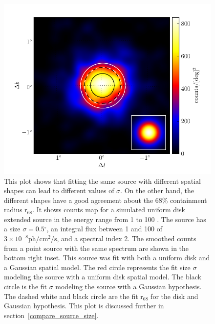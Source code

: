 \documentclass[12pt,preprint]{aastex}
\newcommand{\gev}{\text{GeV}\xspace}
\newcommand{\ph}{\text{ph}\xspace}
\newcommand{\cm}{\text{cm}\xspace}
\renewcommand{\sec}{\text{s}\xspace}
\newcommand{\rsixeight}{{\ensuremath{\text{r}_{68}}}\xspace}
\renewcommand{\deg}{\ensuremath{^\circ}\xspace}
\begin{document}
  \begin{figure}
    \begin{center}
      \includegraphics{mc_plots/compare_r68.pdf}
      \end{center}
      \caption{
      This plot shows that fitting the same source with different spatial
      shapes can lead to different values of $\sigma$. On the other
      hand, the different shapes have a good agreement about the 68\%
      containment radius \rsixeight.  It shows counts map for a simulated
      uniform disk extended source in the energy range from 1 \gev to
      100 \gev.  The source has a size $\sigma=0.5\deg$, an integral flux
      between 1 \gev and 100 \gev of $3\times 10^{-8}\ph/\cm^2/\sec$, and
      a spectral index 2.  The smoothed counts from a point source with
      the same spectrum are shown in the bottom right inset.  This source
      was fit with both a uniform disk and a Gaussian spatial model.
      The red circle represents the fit size $\sigma$ modeling the
      source with a uniform disk spatial model.  The black circle is
      the fit $\sigma$ modeling the source with a Gaussian hypothesis.
      The dashed white and black circle are the fit \rsixeight for the
      disk and Gaussian hypothesis. This plot is discussed further in
      section~\ref{compare_source_size}.
      }\label{compare_r68}
    \end{figure}
\end{document}
